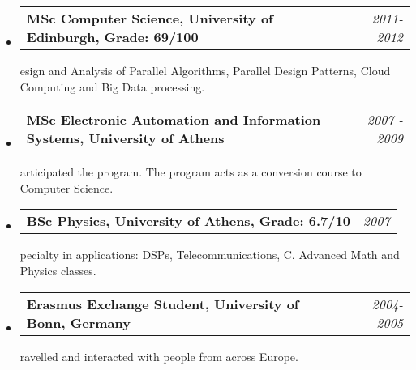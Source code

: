 \documentclass[10pt]{article}
\makeatletter
\newenvironment{position}[4]
{\filbreak
\item
  \begin{tabular*}{6.5in}{l@{\extracolsep{\fill}}r}
    \textbf{#1} & \textit{#2}\\
  \end{tabular*}
  
  \begin{itemize}
    \setlength{\parskip}{-1pt}
  } {\end{itemize}}
\newenvironment{region}[1]
{{\large \textbf{#1}}
  \begin{itemize}
  }{\end{itemize}}
\makeatother
\begin{document}
\begin{region}{Education}
  \begin{position}
    {MSc Computer Science, University of Edinburgh, Grade: 69/100}
    {2011-2012}

  \item Design and Analysis of Parallel Algorithms,
Parallel Design Patterns,
Cloud Computing and Big Data processing.
  \end{position}

  \begin{position}
    {MSc Electronic Automation and Information Systems, University of Athens}
    {2007 - 2009}
    
  \item  Participated the program. The program acts as a conversion course to Computer Science.
  \end{position}
  
 
  \begin{position}
    {BSc Physics, University of Athens, Grade: 6.7/10}
    {2007}

  \item Specialty in applications: DSPs, Telecommunications, C. Advanced Math and Physics classes.

  
  
  \end{position}
  
  \begin{position}
    {Erasmus Exchange Student, University of Bonn, Germany}
    {2004-2005}
    
  \item  Travelled and interacted with people from across Europe.
  \end{position}
 
\end{region}
\end{document}
